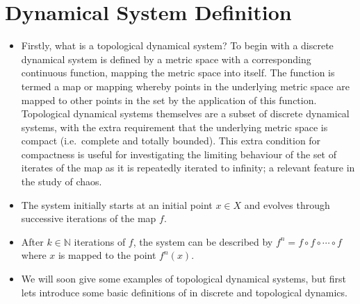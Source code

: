 \documentclass{article}
\begin{document}
    \section{Dynamical System Definition}
    \begin{itemize}
        \item Firstly, what is a topological dynamical system? To begin with a discrete dynamical system is defined by a metric space with a corresponding continuous function, mapping the metric space into itself. The function is termed a map or mapping whereby points in the underlying metric space are mapped to other points in the set by the application of this function. Topological dynamical systems themselves are a subset of discrete dynamical systems, with the extra requirement that the underlying metric space is compact (i.e.\ complete and totally bounded). This extra condition for compactness is useful for investigating the limiting behaviour of the set of iterates of the map as it is repeatedly iterated to infinity; a relevant feature in the study of chaos.
        \item The system initially starts at an initial point $x \in X$ and evolves through successive iterations of the map $f$.
        \item After $k \in \mathbb{N}$ iterations of $f$, the system can be described by $f^n = f \circ f \circ \cdots \circ f$ where $x$ is mapped to the point $f^n(x)$.
        \item We will soon give some examples of topological dynamical systems, but first lets introduce some basic definitions of in discrete and topological dynamics.
    \end{itemize}
\end{document}
